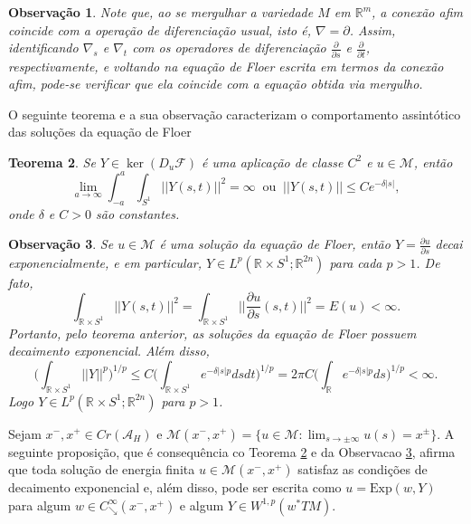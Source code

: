\documentclass[12pt]{book}
\newtheorem{teorema}{Teorema}[section]
\newtheorem{observacao}[teorema]{Observação}
\newcommand{\bigparenteses}[1]{\Big( #1 \Big) }
\newcommand{\caminhosdecaimentoexponencial}[2]{C^{\infty}_{\searrow}(#1, #2)}
\newcommand{\caminhosdecaimentoexponencialpadrao}{\caminhosdecaimentoexponencial{x^{-}}{x^{+}}}
\newcommand{\circulo}{S^{1}}
\newcommand{\diferencialfloerponto}[1]{D_{#1}\operadorFloer}
\newcommand{\derivadaparcial}[2]{\frac{\partial #1}{\partial #2}}
\newcommand{\energiafinitaM}{\mathcal{M}}
\newcommand{\energiafinitaMconectante}{\energiafinitaM(x^{-}, x^{+})}
\newcommand{\espacoLpcontradominio}[2]{L^{p}(#1;#2)}
\newcommand{\espacosobolev}[1]{W^{1,p}(#1)}
\newcommand{\Exp}{\text{Exp}}
\newcommand{\funcionalH}{\mathcal{A}_{H}}
\newcommand{\operadorFloer}{\mathcal{F}}
\newcommand{\norma}[1]{||#1||}
\newcommand{\normagrande}[1]{\Big|\Big|#1\Big|\Big|}
\newcommand{\normaLpdefinicao}[2]{ \Big(\int_{#2}#1^{p}\Big)^{1/p}}
\newcommand{\pontoscriticos}[1]{\textit{Cr}(#1)}
\newcommand{\pullbackfibradotangente}[2]{#1^{*}T#2}
\newcommand{\pullbackfibradotangenteM}[1]{\pullbackfibradotangente{#1}{M}}
\newcommand{\retacartesianocirculo}{\real{} \times \circulo}
\newcommand{\real}[1]{\mathbb{R}^{#1}}
\newcommand{\reta}{\real{}}
\begin{document}
	\begin{observacao}
		Note que, ao se mergulhar a variedade $M$ em $\real{m}$, a conexão afim coincide com a operação de diferenciação usual, isto é,  $\nabla=\partial$. Assim, identificando $\nabla_{s}$ e $\nabla_{t}$ com os operadores de diferenciação $\derivadaparcial{}{s}$ e $\derivadaparcial{}{t}$, respectivamente, e voltando na equação de Floer escrita em termos da conexão afim, pode-se verificar que ela coincide com a equação obtida via mergulho.
	\end{observacao}
	
	O seguinte teorema e a sua observação caracterizam o comportamento assintótico das soluções da equação de Floer
	
	\begin{teorema}\label{teorema_decaimento_exponencial_solucao_floer}
		Se $Y \in \ker(\diferencialfloerponto{u})$ é uma aplicação de classe $C^{2}$ e $u \in \energiafinitaM$, então 
		$$
		\lim\limits_{a\to \infty}\int_{-a}^{a}\int_{\circulo}\norma{Y(s,t)}^{2} = \infty \;\;\text{ou}\;\; \norma{Y(s,t)} \leq Ce^{-\delta|s|},
		$$
		onde $\delta$ e $C>0$ são constantes.
	\end{teorema}
	
	\begin{observacao}\label{observacao_decaimento_exponencial_solucao_floer}
		Se $u \in \energiafinitaM$ é uma solução da equação de Floer, então $Y=\derivadaparcial{u}{s}$ decai exponencialmente, e em particular, $Y \in \espacoLpcontradominio{\retacartesianocirculo}{\real{2n}}$ para cada $p>1$. De fato, 
		$$
		\int_{\retacartesianocirculo}\normagrande{Y(s,t)}^{2} = \int_{\retacartesianocirculo}\normagrande{\derivadaparcial{u}{s}(s,t) }^{2}=E(u)<\infty.
		$$
		Portanto, pelo teorema anterior, as soluções da equação de Floer possuem decaimento exponencial. Além disso, 
		$$
		\normaLpdefinicao{\norma{Y}}{\retacartesianocirculo} \leq C\bigparenteses{\int_{\retacartesianocirculo}e^{-\delta|s|p}dsdt}^{1/p} = 2\pi C\bigparenteses{\int_{\reta}e^{-\delta|s|p}ds }^{1/p}<\infty.
		$$ 
		Logo $Y \in \espacoLpcontradominio{\retacartesianocirculo}{\real{2n}}$ para $p>1$.
	\end{observacao}
	Sejam $x^{-}, x^{+} \in \pontoscriticos{\funcionalH}$ e $\energiafinitaMconectante =\{u\in \energiafinitaM: \lim_{s\to \pm \infty}u(s) =x^{\pm}\}$.
	A seguinte proposição, que é consequência co Teorema \ref{teorema_decaimento_exponencial_solucao_floer} e da Observacao \ref{observacao_decaimento_exponencial_solucao_floer}, afirma que toda solução de energia finita $u \in \energiafinitaMconectante$ satisfaz as condições de decaimento exponencial e, além disso, pode ser escrita como $u=\Exp(w,Y)$ para algum $w\in \caminhosdecaimentoexponencialpadrao$ e algum $Y\in \espacosobolev{\pullbackfibradotangenteM{w}}$.
	
\end{document}
